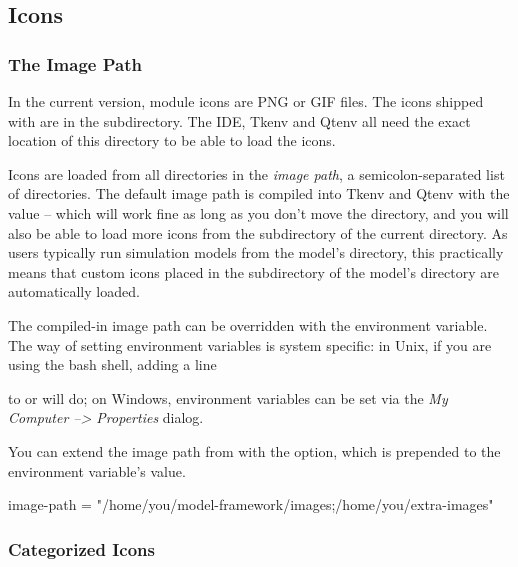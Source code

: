 \subsection{Icons}
\label{sec:graphics:icon-library}

\subsubsection{The Image Path}
\label{sec:graphics:image-path}

In the current {\opp} version, module icons are PNG or GIF files. The icons shipped
with {\opp} are in the  subdirectory. The IDE, Tkenv and Qtenv all
need the exact location of this directory to be able to load the icons.

Icons are loaded from all directories in the \textit{image path},
a semicolon-separated list of directories.
The default image path is compiled into Tkenv and Qtenv with the value
 -- which will work fine
as long as you don't move the directory, and you will also be able to
load more icons from the  subdirectory of the current
directory. As users typically run simulation models from the model's
directory, this practically means that custom icons placed in the
 subdirectory of the model's directory are automatically
loaded.

The compiled-in image path can be overridden with the 
environment variable. The way of setting environment variables is system
specific: in Unix, if you are using the bash shell, adding a line


to  or  will do;
on Windows, environment variables can be set via the \textit{My Computer --> Properties} dialog.

You can extend the image path from  with the
 option, which is prepended to the environment
variable's value.

\begin{inifile}
[General]
image-path = "/home/you/model-framework/images;/home/you/extra-images"
\end{inifile}


\subsubsection{Categorized Icons}
\label{sec:graphics:categorized-icons}

